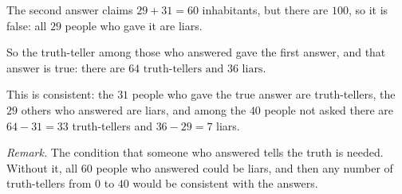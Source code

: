 The second answer claims $29+31=60$ inhabitants, but there are $100$, so it is false: all $29$ people who gave it are liars.

So the truth-teller among those who answered gave the first answer, and that answer is true: there are $\boxed{64\text{ truth-tellers and }36\text{ liars}}$.

This is consistent: the $31$ people who gave the true answer are truth-tellers, the $29$ others who answered are liars, and among the $40$ people not asked there are $64-31=33$ truth-tellers and $36-29=7$ liars.

\emph{Remark.} The condition that someone who answered tells the truth is needed. Without it, all $60$ people who answered could be liars, and then any number of truth-tellers from $0$ to $40$ would be consistent with the answers.
